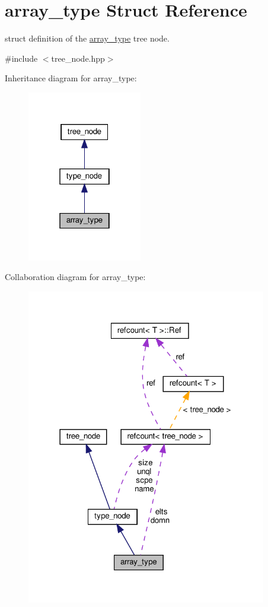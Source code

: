 \hypertarget{structarray__type}{}\section{array\+\_\+type Struct Reference}
\label{structarray__type}


struct definition of the \hyperlink{structarray__type}{array\+\_\+type} tree node.  




{\ttfamily \#include $<$tree\+\_\+node.\+hpp$>$}



Inheritance diagram for array\+\_\+type\+:
\nopagebreak
\begin{figure}[H]
\begin{center}
\leavevmode
\includegraphics[width=142pt]{d5/d51/structarray__type__inherit__graph}
\end{center}
\end{figure}


Collaboration diagram for array\+\_\+type\+:
\nopagebreak
\begin{figure}[H]
\begin{center}
\leavevmode
\includegraphics[width=297pt]{d5/d83/structarray__type__coll__graph}
\end{center}
\end{figure}
